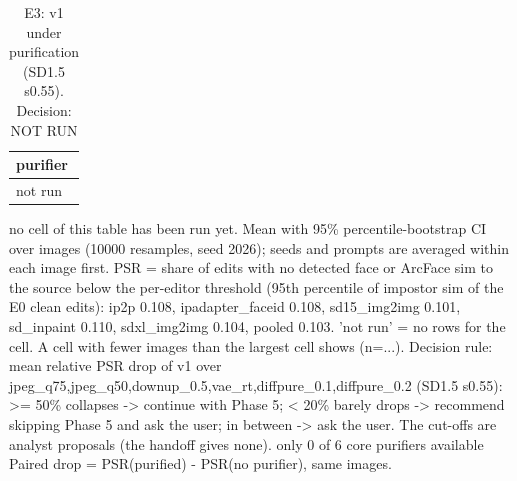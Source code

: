 \begin{table}[t]
\centering
\small
\begin{tabular}{l}
\toprule
purifier \\
\midrule
not run \\
\bottomrule
\end{tabular}
\caption{E3: v1 under purification (SD1.5 s0.55). Decision: NOT RUN}
\label{tab:e3}
\par\footnotesize no cell of this table has been run yet. Mean with 95\% percentile-bootstrap CI over images (10000 resamples, seed 2026); seeds and prompts are averaged within each image first. PSR = share of edits with no detected face or ArcFace sim to the source below the per-editor threshold (95th percentile of impostor sim of the E0 clean edits): ip2p 0.108, ipadapter\_faceid 0.108, sd15\_img2img 0.101, sd\_inpaint 0.110, sdxl\_img2img 0.104, pooled 0.103. 'not run' = no rows for the cell. A cell with fewer images than the largest cell shows (n=...). Decision rule: mean relative PSR drop of v1 over jpeg\_q75,jpeg\_q50,downup\_0.5,vae\_rt,diffpure\_0.1,diffpure\_0.2 (SD1.5 s0.55): >= 50\% collapses -> continue with Phase 5; < 20\% barely drops -> recommend skipping Phase 5 and ask the user; in between -> ask the user. The cut-offs are analyst proposals (the handoff gives none). only 0 of 6 core purifiers available Paired drop = PSR(purified) - PSR(no purifier), same images.
\end{table}
